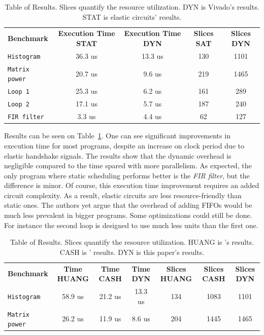 \documentclass{article}
\begin{document}
\begin{table}
  \hspace{-2cm}
  \begin{tabular}{l c c c c}
    \textbf{Benchmark} & \textbf{Execution Time STAT} & \textbf{Execution Time DYN} & \textbf{Slices SAT} & \textbf{Slices DYN}\\
    \texttt{Histogram} & 36.3 us & 13.3 us & 130 & 1101\\
    \texttt{Matrix power} & 20.7 us & 9.6 us & 219 & 1465\\
    \texttt{Loop 1} & 25.3 us & 6.2 us & 161 & 289\\
    \texttt{Loop 2} & 17.1 us & 5.7 us & 187 & 240\\
    \texttt{FIR filter} & 3.3 us & 4.4 us & 62 & 127
  \end{tabular}
  \caption{Table of Results. Slices quantify the resource utilization. DYN is Vivado's results. STAT is elastic circuits' results.}
  \label{table:results_stat}
\end{table}

Results can be seen on Table~\ref{table:results_stat}. One can see significant improvements in execution time for most programs, despite an increase on clock period due to elastic handshake signals.
The results show that the dynamic overhead is negligible compared to the time spared with more parallelism. As expected, the only program where static scheduling performs better is the \textit{FIR filter}, but the difference is minor.
Of course, this execution time improvement requires an added circuit complexity. As a result, elastic circuits are less resource-friendly than static ones. The authors yet argue that the overhead of adding FIFOs would be much less prevalent in bigger programs. Some optimizations could still be done. For instance the second loop is designed to use much less units than the first one.

\begin{table}
  \hspace{-3cm}
  \begin{tabular}{l c c c c c c}
    \textbf{Benchmark} & \textbf{Time HUANG} & \textbf{Time CASH} & \textbf{Time DYN} & \textbf{Slices HUANG} & \textbf{Slices CASH} & \textbf{Slices DYN}\\
    \texttt{Histogram} & 58.9 us & 21.2 us & 13.3 us & 134 & 1083 & 1101\\
    \texttt{Matrix power} & 26.2 us & 11.9 us & 8.6 us & 204 & 1445 & 1465
  \end{tabular}
  \caption{Table of Results. Slices quantify the resource utilization. HUANG is \cite{DBLP:conf/fpga/HuangITCW13}'s results. CASH is \cite{budiu-tr02}' results. DYN is this paper's results.}
  \label{table:results_dyn}
\end{table}
\end{document}

